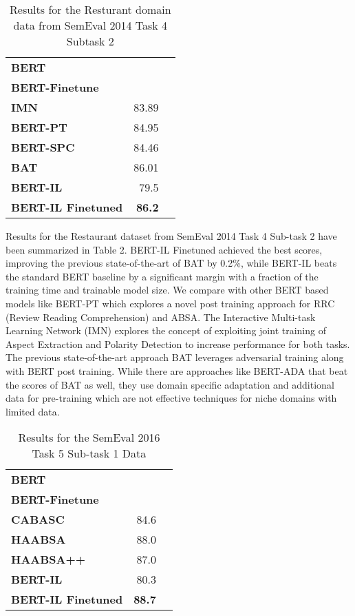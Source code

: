 \documentclass[11pt,a4paper]{article}
\begin{document}
\begin{table}[!htp]\centering
\scriptsize
\large
\begin{tabular}{lrr}\toprule
\textbf{BERT} & \\
\textbf{BERT-Finetune} & \\
\textbf{IMN} &83.89 \\
\textbf{BERT-PT} &84.95 \\
\textbf{BERT-SPC} &84.46 \\
\textbf{BAT} &86.01 \\
\textbf{BERT-IL} &79.5 \\
\textbf{BERT-IL Finetuned} &\textbf{86.2} \\
\bottomrule
\end{tabular}
\caption{Results for the Resturant domain data from SemEval 2014 Task 4 Subtask 2}\label{tab: }

\end{table}

Results for the Restaurant dataset from SemEval 2014 Task 4 Sub-task 2 have been summarized in Table 2. BERT-IL Finetuned achieved the best scores, improving the previous state-of-the-art of BAT by 0.2\%, while BERT-IL beats the standard BERT baseline by a significant margin with a fraction of the training time and trainable model size. We compare with other BERT based models like BERT-PT which explores a novel post training approach for RRC (Review Reading Comprehension) and ABSA. The Interactive Multi-task Learning Network (IMN) \cite{he2019interactive} explores the concept of exploiting joint training of Aspect Extraction and Polarity Detection to increase performance for both tasks. The previous state-of-the-art approach BAT leverages adversarial training along with BERT post training. While there are approaches like BERT-ADA \cite{rietzler2019adapt} that beat the scores of BAT as well, they use domain specific adaptation and additional data for pre-training which are not effective techniques for niche domains with limited data. 



\begin{table}[!htp]\centering
\large

\begin{tabular}{lrr}\toprule
\textbf{BERT} & \\
\textbf{BERT-Finetune} & \\
\textbf{CABASC} &84.6 \\
\textbf{HAABSA} &88.0 \\
\textbf{HAABSA++} &87.0 \\
\textbf{BERT-IL} &80.3 \\
\textbf{BERT-IL Finetuned} &\textbf{88.7} \\
\bottomrule
\end{tabular}
\caption{Results for the SemEval 2016 Task 5 Sub-task 1 Data}\label{tab: }
\end{table}
\end{document}

